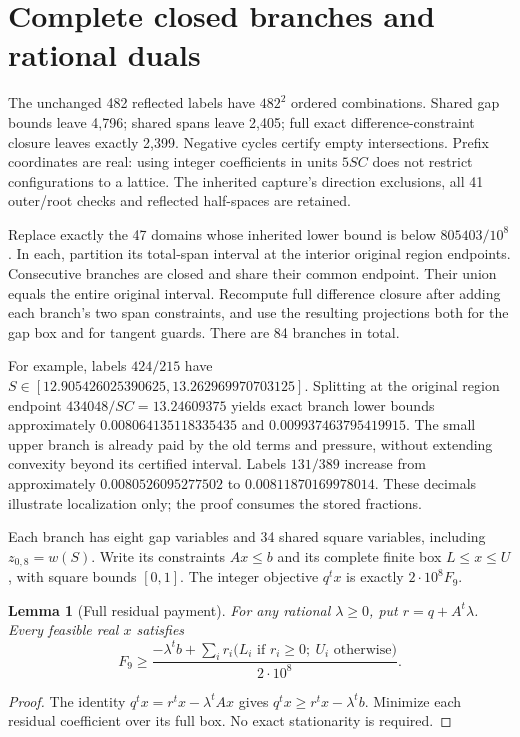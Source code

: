 \documentclass[11pt,a4paper]{article}
\newtheorem{lemma}[theorem]{Lemma}
\begin{document}
\section{Complete closed branches and rational duals}\label{sec:certificate}

The unchanged 482 reflected labels have $482^2$ ordered combinations.
Shared gap bounds leave 4,796; shared spans leave 2,405; full exact
difference-constraint closure leaves exactly 2,399. Negative cycles
certify empty intersections. Prefix coordinates are real: using integer
coefficients in units $5SC$ does not restrict configurations to a lattice.
The inherited capture's direction exclusions, all 41 outer/root checks
and reflected half-spaces are retained.

Replace exactly the 47 domains whose inherited lower bound is below
$805403/10^8$. In each, partition its total-span interval at the interior
original region endpoints. Consecutive branches are closed and share
their common endpoint. Their union equals the entire original interval.
Recompute full difference closure after adding each branch's two span
constraints, and use the resulting projections both for the gap box and
for tangent guards. There are 84 branches in total.

For example, labels $424/215$ have
$S\in[12.905426025390625,13.262969970703125]$. Splitting at
the original region endpoint $434048/SC=13.24609375$ yields exact
branch lower bounds approximately $0.008064135118335435$ and
$0.009937463795419915$. The small upper branch is already paid by
the old terms and pressure, without extending convexity beyond its
certified interval. Labels $131/389$ increase from approximately
$0.0080526095277502$ to $0.00811870169978014$. These decimals
illustrate localization only; the proof consumes the stored fractions.

Each branch has eight gap variables and 34 shared square variables,
including $z_{0,8}=w(S)$. Write its constraints $Ax\le b$ and its
complete finite box $L\le x\le U$, with square bounds $[0,1]$.
The integer objective $q^tx$ is exactly $2\cdot10^8F_9$.

\begin{lemma}[Full residual payment]\label{lem:dual}
For any rational $\lambda\ge0$, put $r=q+A^t\lambda$. Every
feasible real $x$ satisfies
\[
 F_9\ge\frac{-\lambda^tb+
    \sum_i r_i\bigl(L_i\text{ if }r_i\ge0;\ U_i\text{ otherwise}\bigr)}
    {2\cdot10^8}.
\]
\end{lemma}
\begin{proof}
The identity $q^tx=r^tx-\lambda^tAx$ gives
$q^tx\ge r^tx-\lambda^tb$. Minimize each residual coefficient
over its full box. No exact stationarity is required.
\end{proof}
\end{document}
